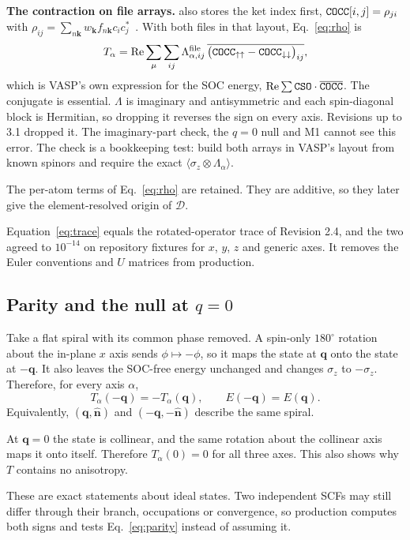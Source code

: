 \documentclass[11pt,a4paper]{article}
\numberwithin{equation}{section}
\newcommand{\vct}[1]{\bm{#1}}
\newcommand{\nh}{\hat{\vct n}}
\newcommand{\qh}{\vct q}
\newcommand{\kh}{\vct k}
\newcommand{\Dt}{\mathcal D}
\newcommand{\code}[1]{\texttt{\detokenize{#1}}}
\begin{document}
\textbf{The contraction on file arrays.} \code{COCC.dat} also stores the ket
index first, $\code{COCC}[i,j]=\rho_{ji}$ with
$\rho_{ij}=\sum_{n\kh}w_{\kh}f_{n\kh}c_ic_j^{*}$~\cite{vaspsrc}. With both files
in that layout, Eq.~\eqref{eq:rho} is
\[
 T_\alpha=\operatorname{Re}\sum_\mu\sum_{ij}
 \Lambda^{\rm file}_{\alpha,ij}\,
 \overline{\bigl(\code{COCC}_{\uparrow\uparrow}-\code{COCC}_{\downarrow\downarrow}\bigr)_{ij}} ,
\]
which is VASP's own expression for the SOC energy,
$\operatorname{Re}\sum\code{CSO}\cdot\overline{\code{COCC}}$. The conjugate is
essential. $\Lambda$ is imaginary and antisymmetric and each spin-diagonal
block is Hermitian, so dropping it reverses the sign on every axis. Revisions
up to 3.1 dropped it. The imaginary-part check, the $q=0$ null and M1 cannot
see this error. The check is a bookkeeping test: build both arrays in VASP's
layout from known spinors and require the exact $\langle\sigma_z\otimes\Lambda_\alpha\rangle$.

The per-atom terms of Eq.~\eqref{eq:rho} are retained. They are additive,
so they later give the element-resolved origin of $\Dt$.

Equation~\eqref{eq:trace} equals the rotated-operator trace of Revision 2.4,
and the two agreed to $10^{-14}$ on repository fixtures for $x$, $y$, $z$ and
generic axes. It removes the Euler conventions and $U$ matrices from production.

\subsection{Parity and the null at \(q=0\)}\label{sec:parity}

Take a flat spiral with its common phase removed. A spin-only $180^\circ$
rotation about the in-plane $x$ axis sends $\phi\mapsto-\phi$, so it maps the
state at $\qh$ onto the state at $-\qh$. It also leaves the SOC-free energy
unchanged and changes $\sigma_z$ to $-\sigma_z$. Therefore, for every axis $\alpha$,
\begin{equation}\label{eq:parity}
 T_\alpha(-\qh)=-T_\alpha(\qh),\qquad E(-\qh)=E(\qh).
\end{equation}
Equivalently, $(\qh,\nh)$ and $(-\qh,-\nh)$ describe the same spiral.

At $\qh=0$ the state is collinear, and the same rotation about the collinear
axis maps it onto itself. Therefore $T_\alpha(0)=0$ for all three axes. This
also shows why $T$ contains no anisotropy.

These are exact statements about ideal states. Two independent SCFs may still
differ through their branch, occupations or convergence, so production computes
both signs and tests Eq.~\eqref{eq:parity} instead of assuming it.
\end{document}
